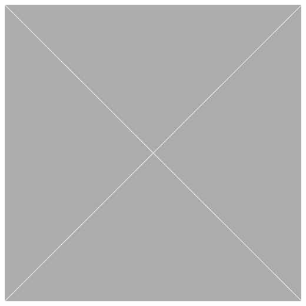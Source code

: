\documentclass[12pt]{article}
\newenvironment{Figure}
	{\par\medskip\noindent\minipage{\linewidth}}
	{\endminipage\par\medskip}
\begin{document}
\begin{multicols}{2}
\begin{Figure}
	\includegraphics[width=\linewidth]{illustrations/placeholder.jpg}
	\label{fig:applicationdiagram}
\end{Figure}


\end{multicols}
\end{document}
